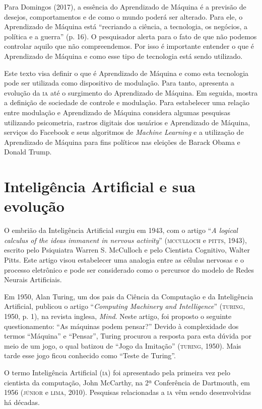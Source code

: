 Para Domingos (2017), a essência do Aprendizado de Máquina é a previsão
de desejos, comportamentos e de como o mundo poderá ser alterado. Para
ele, o Aprendizado de Máquina está ``recriando a ciência, a tecnologia,
os negócios, a política e a guerra'' (p. 16). O pesquisador alerta para
o fato de que não podemos controlar aquilo que não compreendemos. Por
isso é importante entender o que é Aprendizado de Máquina e como esse
tipo de tecnologia está sendo utilizado.

Este texto visa definir o que é Aprendizado de Máquina e como esta
tecnologia pode ser utilizada como dispositivo de modulação. Para tanto,
apresenta a evolução da \textsc{ia} até o surgimento do Aprendizado de Máquina.
Em seguida, mostra a definição de sociedade de controle e modulação.
Para estabelecer uma relação entre modulação e Aprendizado de Máquina
considera algumas pesquisas utilizando psicometria, rastros digitais dos
usuários e Aprendizado de Máquina, serviços do Facebook e seus
algoritmos de \emph{Machine Learning} e a utilização de Aprendizado de
Máquina para fins políticos nas eleições de Barack Obama e Donald Trump.

\section{Inteligência Artificial e sua evolução}

\noindent{}O embrião da Inteligência Artificial surgiu em 1943, com o artigo
``\emph{A logical calculus of the ideas immanent in nervous activity}''
(\textsc{mcculloch} e \textsc{pitts}, 1943), escrito pelo Psiquiatra Warren S. McCulloch e
pelo Cientista Cognitivo, Walter Pitts. Este artigo visou estabelecer
uma analogia entre as células nervosas e o processo eletrônico e pode ser considerado como o percursor do modelo de Redes Neurais Artificiais.

Em 1950, Alan Turing, um dos pais da Ciência da Computação e da
Inteligência Artificial, publicou o artigo ``\emph{Computing Machinery
and Intelligence}'' (\textsc{turing}, 1950, p. 1), na revista inglesa, \emph{Mind}.
Neste artigo, foi proposto o seguinte questionamento: ``As máquinas
podem pensar?'' Devido à complexidade dos termos ``Máquina'' e
``Pensar'', Turing procurou a resposta para esta dúvida por meio de um
jogo, o qual batizou de ``Jogo da Imitação'' (\textsc{turing}, 1950). Mais tarde
esse jogo ficou conhecido como ``Teste de Turing''.

O termo Inteligência Artificial (\textsc{ia}) foi apresentado pela primeira vez
pelo cientista da computação, John McCarthy, na 2ª Conferência de
Dartmouth, em 1956 (\textsc{júnior} e \textsc{lima}, 2010). Pesquisas relacionadas a \textsc{ia}
vêm sendo desenvolvidas há décadas.

